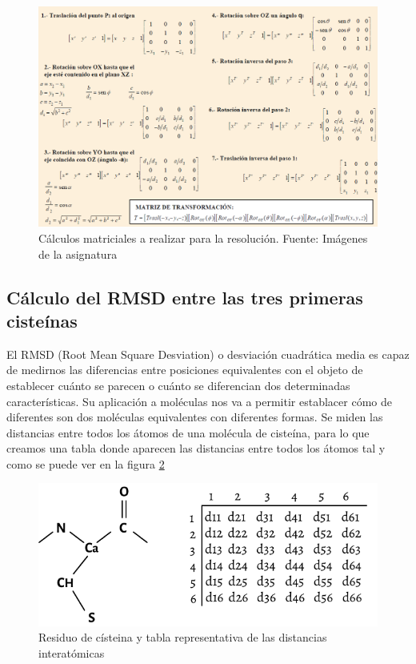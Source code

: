 \documentclass[a4paper,11pt]{report}
\begin{document}
 \begin{figure}[h!]
 	\centering
 	\includegraphics[width=\textwidth]{Figuras/Figura35}
 	\caption{Cálculos matriciales a realizar para la resolución. Fuente: Imágenes de la asignatura}
 	\label{matri}
 \end{figure}
 
 \subsection{Cálculo del RMSD entre las tres primeras cisteínas}
 El RMSD (Root Mean Square Desviation) o desviación cuadrática media es capaz de medirnos las diferencias entre posiciones equivalentes con el objeto de establecer cuánto se parecen o cuánto se diferencian dos determinadas características. Su aplicación a moléculas nos va a permitir establacer cómo de diferentes son dos moléculas equivalentes con diferentes formas.
 Se miden las distancias entre todos los átomos de una molécula de cisteína, para lo que creamos una tabla donde aparecen las distancias entre todos los átomos tal y como se puede ver en la figura \ref{fig: rmsd}
 \begin{figure}[h!] 
 \includegraphics[width=\textwidth]{Figuras/Figura20}
 \caption{Residuo de císteina y tabla representativa de las distancias interatómicas}
 \label{fig: rmsd}
 \end{figure}
\end{document}
